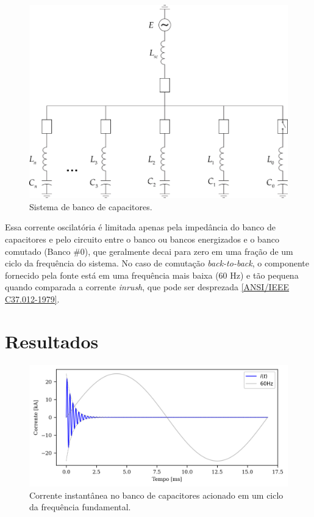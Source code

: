 \documentclass[a4paper]{article}
\begin{document}
	
\begin{figure}[!hbp]
	\centering
	\includegraphics{Picture1.png}
	\caption{Sistema de banco de capacitores.}
	\label{fig:picture1}
\end{figure}


Essa corrente oscilatória é limitada apenas pela impedância do banco de capacitores e pelo circuito entre o banco ou bancos energizados e o banco comutado (Banco \#0), que geralmente decai para zero em uma fração de um ciclo da frequência do sistema. No caso de comutação \textit{back-to-back}, o componente fornecido pela fonte está em uma frequência mais baixa (60 Hz) e tão pequena quando comparada a corrente \textit{inrush}, que pode ser desprezada \href{https://ieeexplore.ieee.org/document/7035261}{[ANSI/IEEE C37.012-1979]}.



\section{Resultados}
\begin{figure}[!hbp]
	\centering
	\includegraphics{Correntes.png}
	\caption{Corrente instantânea no banco de capacitores acionado em um ciclo da frequência fundamental.}
	\label{fig:picture2}
\end{figure}
\end{document}
